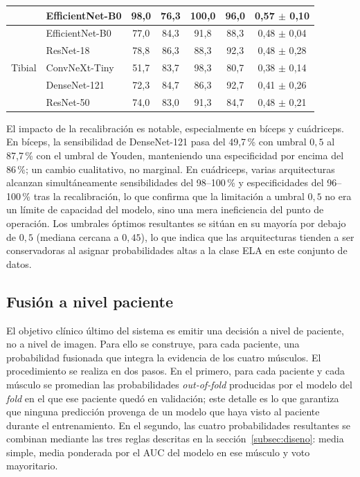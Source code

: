 \documentclass[12pt]{extarticle}
\numberwithin{equation}{section}
\begin{document}
\begin{refsection}
\begin{table}[h!]
\begin{tabular}{llccccc}
                            & EfficientNet-B0& 98{,}0 & 76{,}3 & 100{,}0 & 96{,}0 & 0{,}57 $\pm$ 0{,}10 \\
\midrule
\multirow{5}{*}{Tibial} & EfficientNet-B0   & 77{,}0 & 84{,}3 & 91{,}8 & 88{,}3 & 0{,}48 $\pm$ 0{,}04 \\
                        & ResNet-18         & 78{,}8 & 86{,}3 & 88{,}3 & 92{,}3 & 0{,}48 $\pm$ 0{,}28 \\
                        & ConvNeXt-Tiny     & 51{,}7 & 83{,}7 & 98{,}3 & 80{,}7 & 0{,}38 $\pm$ 0{,}14 \\
                        & DenseNet-121      & 72{,}3 & 84{,}7 & 86{,}3 & 92{,}7 & 0{,}41 $\pm$ 0{,}26 \\
                        & ResNet-50         & 74{,}0 & 83{,}0 & 91{,}3 & 84{,}7 & 0{,}48 $\pm$ 0{,}21 \\
\bottomrule
\end{tabular}
\end{table}

El impacto de la recalibración es notable, especialmente en bíceps y cuádriceps. En bíceps, la sensibilidad de DenseNet-121 pasa del 49{,}7\,\% con umbral $0{,}5$ al 87{,}7\,\% con el umbral de Youden, manteniendo una especificidad por encima del 86\,\%; un cambio cualitativo, no marginal. En cuádriceps, varias arquitecturas alcanzan simultáneamente sensibilidades del 98--100\,\% y especificidades del 96--100\,\% tras la recalibración, lo que confirma que la limitación a umbral $0{,}5$ no era un límite de capacidad del modelo, sino una mera ineficiencia del punto de operación. Los umbrales óptimos resultantes se sitúan en su mayoría por debajo de $0{,}5$ (mediana cercana a $0{,}45$), lo que indica que las arquitecturas tienden a ser conservadoras al asignar probabilidades altas a la clase ELA en este conjunto de datos.

\subsection{Fusión a nivel paciente}\label{subsec:resultados-fusion}

El objetivo clínico último del sistema es emitir una decisión a nivel de paciente, no a nivel de imagen. Para ello se construye, para cada paciente, una probabilidad fusionada que integra la evidencia de los cuatro músculos. El procedimiento se realiza en dos pasos. En el primero, para cada paciente y cada músculo se promedian las probabilidades \textit{out-of-fold} producidas por el modelo del \textit{fold} en el que ese paciente quedó en validación; este detalle es lo que garantiza que ninguna predicción provenga de un modelo que haya visto al paciente durante el entrenamiento. En el segundo, las cuatro probabilidades resultantes se combinan mediante las tres reglas descritas en la sección~\ref{subsec:diseno}: media simple, media ponderada por el AUC del modelo en ese músculo y voto mayoritario.


\end{refsection}
\end{document}
